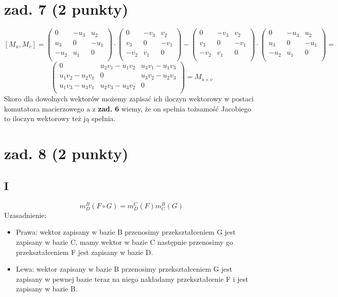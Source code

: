 \documentclass{article}
\begin{document}
\section{zad. 7 (2 punkty)}
$$
[M_u,M_v] = 
\begin{pmatrix}
0 & -u_3 & u_2 \\
u_3 & 0 & -u_1 \\
-u_2 & u_1 & 0 \\
\end{pmatrix} \cdot
\begin{pmatrix}
0 & -v_3 & v_2 \\
v_3 & 0 & -v_1 \\
-v_2 & v_1 & 0 \\
\end{pmatrix} -
\begin{pmatrix}
0 & -v_3 & v_2 \\
v_3 & 0 & -v_1 \\
-v_2 & v_1 & 0 \\
\end{pmatrix} \cdot
\begin{pmatrix}
0 & -u_3 & u_2 \\
u_3 & 0 & -u_1 \\
-u_2 & u_1 & 0 \\
\end{pmatrix} =
$$
$$
\begin{pmatrix}
0 & u_2v_1 - u_1v_2 & u_3v_1 - u_1v_3 \\
u_1v_2 - u_2v_1 & 0 & u_3v_2 - u_2v_3 \\
u_1v_3 - u_3v_1 & u_2v_3-u_3v_2 & 0 \\
\end{pmatrix} =
M_{u\times v}
$$
Skoro dla dowolnych wektorów możemy zapisać ich iloczyn wektorowy w postaci komutatora macierzowego a z \textbf{zad. 6} wiemy, że on spełnia tożsamość Jacobiego to iloczyn wektorowy też ją spełnia.
\section{zad. 8 (2 punkty)}
\subsection*{I}
$$
m_D^B(F\circ G) = m_D^C(F)m_C^B(G)
$$
Uzasadnienie:\\
\begin{itemize}
\item Prawa: wektor zapisany w bazie B przenosimy przekształceniem G jest zapisany w bazie C, mamy wektor w bazie C następnie przenosimy go przekształceniem F jest zapisany w bazie D.
\item Lewa: wektor zapisany w bazie B przenosimy przekształceniem G jest zapisany w pewnej bazie teraz na niego nakładamy przekształcenie F i jest zapisany w bazie B.
\end{itemize}
\end{document}
